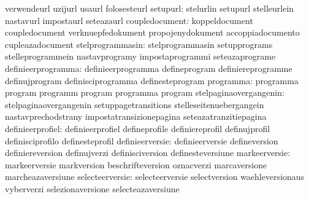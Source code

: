                                   verwendeurl                      uzijurl
                                  usaurl                           folosesteurl
                        setupurl: stelurlin                        setupurl
                                  stelleurlein                     nastavurl
                                  impostaurl                       seteazaurl
                  coupledocument: koppeldocument                   coupledocument
                                  verknuepfedokument               propojenydokument
                                  accoppiadocumento                cupleazadocument
                stelprogrammasin: stelprogrammasin                 setupprograms
                                  stelleprogrammein                nastavprogramy
                                  impostaprogrammi                 seteazaprograme
              definieerprogramma: definieerprogramma               defineprogram
                                  definiereprogramme               definujprogram
                                  definisciprogramma               definesteprogram
                       programma: programma                        program
                                  programm                         program
                                  programma                        program
          stelpaginaovergangenin: stelpaginaovergangenin           setuppagetransitions
                                  stelleseitenuebergangein         nastavprechodstrany
                                  impostatransizionepagina         seteazatranzitiepagina
                definieerprofiel: definieerprofiel                 defineprofile
                                  definiereprofil                  definujprofil
                                  definisciprofilo                 definesteprofil
                 definieerversie: definieerversie                  defineversion
                                  definiereversion                 definujverzi
                                  definisciversion                 definesteversiune
                   markeerversie: markeerversie                    markversion
                                  beschrifteversion                oznacverzi
                                  marcaversione                    marcheazaversiune %
                 selecteerversie: selecteerversie                  selectversion
                                  waehleversionaus                 vyberverzi
                                  selezionaversione                selecteazaversiune %
